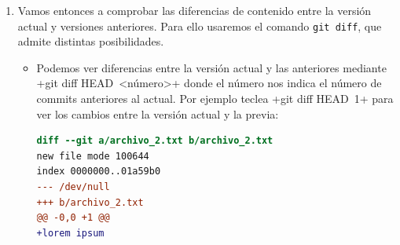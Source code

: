 \documentclass[a5paper,10pt]{article}
\begin{document}
\begin{enumerate}
\begin{lstlisting}[style=custom]
    Added a second line of code

commit 062ccfc2447929add19a36cf6b898b91bd005c90
Author: hectornieto <hector.nieto.solana@gmail.com>
Date:   Sun May 9 11:20:48 2021 +0200

    Fix inital bug

commit ba43a6b0218f5812cd6d4f445231c13819f4bb19
Author: hectornieto <hector.nieto.solana@gmail.com>
Date:   Sun May 9 10:39:02 2021 +0200

    My first commit
    \end{lstlisting}
    
    Por otro lado, con \cverb+git log --oneline+ obtenemos una salida resumida y más fácil de ver del mismo historial:
    \begin{lstlisting}[style=custom]
9a9ea98 (HEAD -> master) Added new module archivo_2
f0cf479 Added a second line of code
062ccfc Fix inital bug
ba43a6b My first commit
    \end{lstlisting}
    con los siete primeros dígitos del id del commit y su descripción\footnote{El id del commit es una frase SHA-1, de 40 dígitos en formato hexadecimal, que incluye la información básica del mismo. Como es probabilísticamente casi imposible que coincidan, uno puede referirse a cualquier commit usando sólo los 7 primeros dígitos}.
    
    El verdadero potencial que tiene \verb+Git+ es que guarda un registro del estado de cada uno de los archivos que hayamos añadido nuestro proyecto, por lo que podemos analizar y restaurar todas y cada una de las versiones que hayamos registrado con \verb+git commit+.
    
    \item Vamos entonces a comprobar las diferencias de contenido entre la versión actual y versiones anteriores. Para ello usaremos el comando \verb+git diff+, que admite distintas posibilidades. 
    \begin{itemize}
      \item Podemos ver diferencias entre la versión actual y las anteriores mediante \cverb+git diff HEAD~<número>+ donde el número nos indica el número de commits anteriores al actual. Por ejemplo teclea 
      \cverb+git diff HEAD~1+ 
      para ver los cambios entre la versión actual y la previa:
      \begin{lstlisting}[language=diff]
diff --git a/archivo_2.txt b/archivo_2.txt
new file mode 100644
index 0000000..01a59b0
--- /dev/null
+++ b/archivo_2.txt
@@ -0,0 +1 @@
+lorem ipsum
      \end{lstlisting}
      

\end{itemize}
\end{enumerate}
\end{document}
